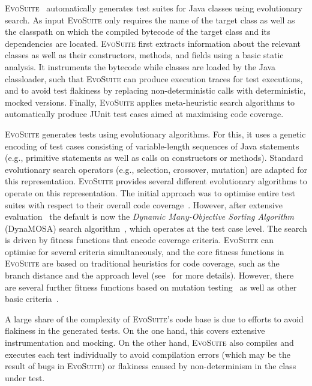 \documentclass[10pt,conference]{IEEEtran}
\newcommand{\EVOSUITE}{\textsc{EvoSuite}\xspace}
\begin{document}
\EVOSUITE~\cite{FrA11c} automatically generates test suites for Java classes
using evolutionary search. As input \EVOSUITE only requires the name of the
target class as well as the classpath on which the compiled bytecode of the
target class and its dependencies are located. \EVOSUITE first extracts
information about the relevant classes as well as their constructors, methods,
and fields using a basic static analysis. It instruments the bytecode while
classes are loaded by the Java classloader, such that \EVOSUITE can produce
execution traces for test executions, and to avoid test flakiness by replacing
non-deterministic calls with deterministic, mocked versions. Finally, \EVOSUITE
applies meta-heuristic search algorithms to automatically produce JUnit test
cases aimed at maximising code coverage.


\EVOSUITE generates tests using evolutionary algorithms.
%
For this, it uses a genetic encoding of test cases consisting of variable-length sequences of Java statements (e.g., primitive statements as well as calls on constructors or methods). Standard evolutionary search operators (e.g., selection, crossover, mutation) are adapted for this representation.
%
\EVOSUITE provides several different evolutionary algorithms to operate on this
representation. The initial approach was to optimise entire test suites with
respect to their overall code coverage~\cite{GoA_TSE12}. However, after
extensive evaluation~\cite{ea_evaluation} the default is now the
\emph{Dynamic Many-Objective Sorting Algorithm} (DynaMOSA) search
algorithm~\cite{dynamosa}, which operates at the test case level.
%
The search is driven by fitness functions that encode coverage criteria. \EVOSUITE can optimise for several criteria simultaneously, and the core fitness functions in \EVOSUITE are based on traditional heuristics for code coverage, such as the branch distance and the approach level (see~\cite{GoA_TSE12} for more details). However, there are several further fitness functions based on mutation testing~\cite{emse14_mutation} as well as other basic criteria~\cite{rojas2015combining}.


A large share of the complexity of \EVOSUITE's code base is due to efforts to
avoid flakiness in the generated tests. On the one hand, this covers extensive
instrumentation and mocking. On the other hand, \EVOSUITE also compiles and
executes each test individually to avoid compilation errors (which may be the
result of bugs in \EVOSUITE) or flakiness caused by non-determinism in the
class under test.
\end{document}
